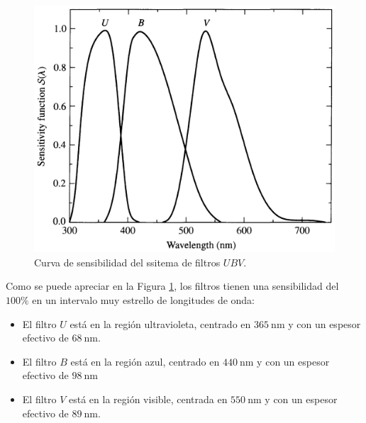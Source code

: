 \begin{figure}[htb]
  \centering
				\includegraphics[width=\textwidth]{figures/UBV-filter.png}
				\caption{Curva de sensibilidad del ssitema de filtros $ UBV $.}
				\label{fig:filters-ubv} 
\end{figure}

Como se puede apreciar en la Figura \ref{fig:filters-ubv}, los filtros tienen una sensibilidad del $ 100\% $ en un intervalo muy estrello de longitudes de onda:
\begin{itemize}
  \item El filtro $U$ está en la región ultravioleta, centrado en $365 \mathrm{~nm}$ y con un espesor efectivo de $68~ \mathrm{nm}$.
  
  \item El filtro $B$ está en la región azul, centrado en $440 ~\mathrm{nm}$ y con un espesor efectivo de $98 ~\mathrm{nm}$
  
   \item El filtro $V$ está en la región visible, centrada en $550 \mathrm{~nm}$ y con un espesor efectivo de $89 ~\mathrm{nm}$​.
\end{itemize}

